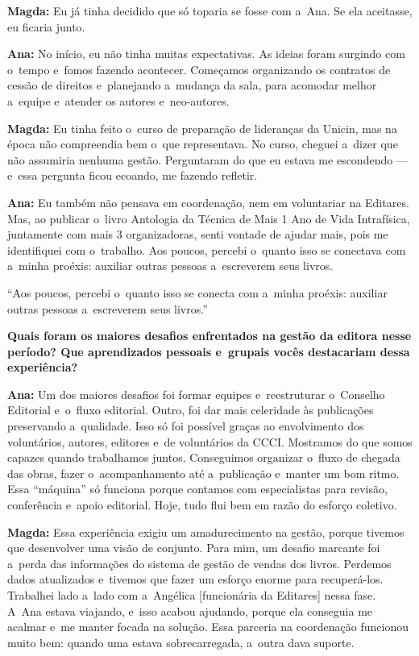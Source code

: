 \documentclass{gescons}
\begin{document}
\begin{multicols}{2}
\textbf{Magda:} Eu já tinha decidido que só toparia se fosse com a~Ana. Se ela aceitasse, eu ficaria junto.

\textbf{Ana:} No início, eu não tinha muitas expectativas. As ideias foram surgindo com o~tempo e~fomos fazendo acontecer. Começamos organizando os contratos de cessão de direitos e~planejando a~mudança da sala, para acomodar melhor a~equipe e~atender os autores e~neo-autores.

\textbf{Magda:} Eu tinha feito o~curso de preparação de lideranças da Unicin, mas na época não compreendia bem o~que representava. No curso, cheguei a~dizer que não assumiria nenhuma gestão. Perguntaram do que eu estava me escondendo --- e~essa pergunta ficou ecoando, me fazendo refletir.

\textbf{Ana:} Eu também não pensava em coordenação, nem em voluntariar na Editares. Mas, ao publicar o~livro Antologia da Técnica de Mais 1 Ano de Vida Intrafísica, juntamente com mais 3 organizadoras, senti vontade de ajudar mais, pois me identifiquei com o~trabalho. Aos poucos, percebi o~quanto isso se conectava com a~minha proéxis: auxiliar outras pessoas a~escreverem seus livros.

\begin{pullquote}
``Aos poucos, percebi o~quanto isso se conecta com a~minha proéxis: auxiliar outras pessoas a~escreverem seus livros.''
\end{pullquote}

\textbf{Quais foram os maiores desafios enfrentados na gestão da editora nesse período? Que aprendizados pessoais e~grupais vocês destacariam dessa experiência?}

\textbf{Ana:} Um dos maiores desafios foi formar equipes e~reestruturar o~Conselho Editorial e~o~fluxo editorial. Outro, foi dar mais celeridade às publicações preservando a~qualidade. Isso só foi possível graças ao envolvimento dos voluntários, autores, editores e~de voluntários da CCCI. Mostramos do que somos capazes quando trabalhamos juntos. Conseguimos organizar o~fluxo de chegada das obras, fazer o~acompanhamento até a~publicação e~manter um bom ritmo. Essa “máquina” só funciona porque contamos com especialistas para revisão, conferência e~apoio editorial. Hoje, tudo flui bem em razão do esforço coletivo.

\textbf{Magda:} Essa experiência exigiu um amadurecimento na gestão, porque tivemos que desenvolver uma visão de conjunto. Para mim, um desafio marcante foi a~perda das informações  do sistema de gestão de vendas dos livros. Perdemos dados atualizados e~tivemos que fazer um esforço enorme para recuperá-los. Trabalhei lado a~lado com a~Angélica {[funcionária da Editares]} nessa fase. A~Ana estava viajando, e~isso acabou ajudando, porque ela conseguia me acalmar e~me manter focada na solução. Essa parceria na coordenação funcionou muito bem: quando uma estava sobrecarregada, a~outra dava suporte.


\end{multicols}
\end{document}
